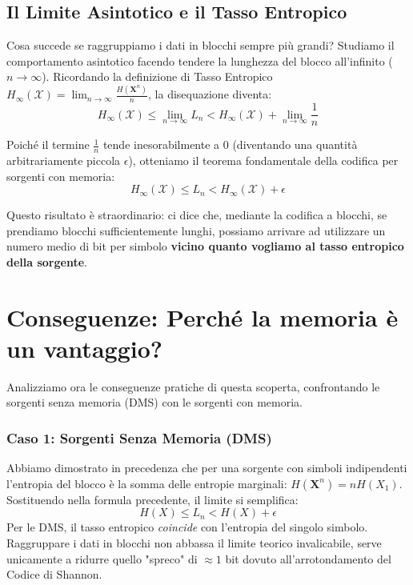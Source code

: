 \subsection{Il Limite Asintotico e il Tasso Entropico}

Cosa succede se raggruppiamo i dati in blocchi sempre più grandi? Studiamo il comportamento asintotico facendo tendere la lunghezza del blocco all'infinito ($n \to \infty$). 
Ricordando la definizione di Tasso Entropico $H_\infty(\mathcal{X}) = \lim_{n \to \infty} \frac{H(\mathbf{X}^n)}{n}$, la disequazione diventa:
\begin{equation}
    H_\infty(\mathcal{X}) \le \lim_{n \to \infty} L_n < H_\infty(\mathcal{X}) + \lim_{n \to \infty} \frac{1}{n}
\end{equation}

Poiché il termine $\frac{1}{n}$ tende inesorabilmente a $0$ (diventando una quantità arbitrariamente piccola $\epsilon$), otteniamo il teorema fondamentale della codifica per sorgenti con memoria:
\begin{equation}
\boxed{ H_\infty(\mathcal{X}) \le L_n < H_\infty(\mathcal{X}) + \epsilon }
\end{equation}

Questo risultato è straordinario: ci dice che, mediante la codifica a blocchi, se prendiamo blocchi sufficientemente lunghi, possiamo arrivare ad utilizzare un numero medio di bit per simbolo \textbf{vicino quanto vogliamo al tasso entropico della sorgente}.

\section{Conseguenze: Perché la memoria è un vantaggio?}

Analizziamo ora le conseguenze pratiche di questa scoperta, confrontando le sorgenti senza memoria (DMS) con le sorgenti con memoria.

\subsubsection*{Caso 1: Sorgenti Senza Memoria (DMS)}
Abbiamo dimostrato in precedenza che per una sorgente con simboli indipendenti l'entropia del blocco è la somma delle entropie marginali: $H(\mathbf{X}^n) = nH(X_1)$. Sostituendo nella formula precedente, il limite si semplifica:
\begin{equation}
    H(X) \le L_n < H(X) + \epsilon
\end{equation}
Per le DMS, il tasso entropico \textit{coincide} con l'entropia del singolo simbolo. Raggruppare i dati in blocchi non abbassa il limite teorico invalicabile, serve unicamente a ridurre quello "spreco" di $\approx 1$ bit dovuto all'arrotondamento del Codice di Shannon.

